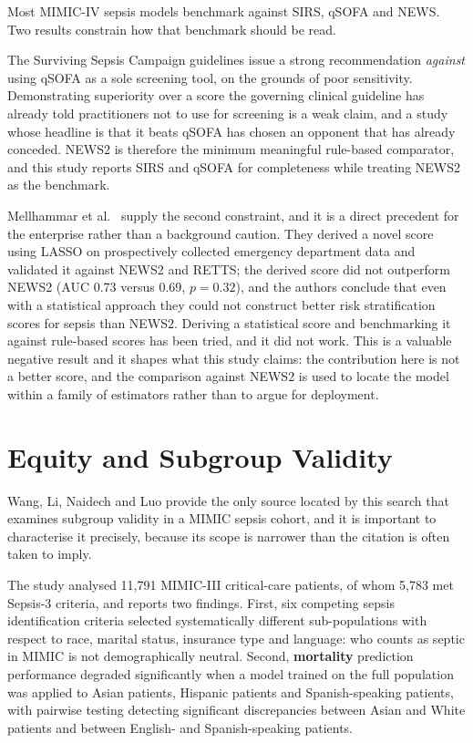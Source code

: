 Most MIMIC-IV sepsis models benchmark against SIRS, qSOFA and NEWS. Two results
constrain how that benchmark should be read.

The Surviving Sepsis Campaign guidelines \cite{evans2021ssc} issue a strong
recommendation \emph{against} using qSOFA as a sole screening tool, on the
grounds of poor sensitivity. Demonstrating superiority over a score the
governing clinical guideline has already told practitioners not to use for
screening is a weak claim, and a study whose headline is that it beats qSOFA
has chosen an opponent that has already conceded. NEWS2 is therefore the minimum
meaningful rule-based comparator, and this study reports SIRS and qSOFA for
completeness while treating NEWS2 as the benchmark.

Mellhammar et al.\ \cite{mellhammar2020news2} supply the second constraint, and
it is a direct precedent for the enterprise rather than a background caution.
They derived a novel score using LASSO on prospectively collected emergency
department data and validated it against NEWS2 and RETTS; the derived score did
not outperform NEWS2 (AUC 0.73 versus 0.69, $p = 0.32$), and the authors
conclude that even with a statistical approach they could not construct better
risk stratification scores for sepsis than NEWS2. Deriving a statistical score
and benchmarking it against rule-based scores has been tried, and it did not
work. This is a valuable negative result and it shapes what this study claims:
the contribution here is not a better score, and the comparison against NEWS2 is
used to locate the model within a family of estimators rather than to argue for
deployment.


\section{Equity and Subgroup Validity}
\label{sec:equity_lit}

Wang, Li, Naidech and Luo \cite{wang2022equity} provide the only source located
by this search that examines subgroup validity in a MIMIC sepsis cohort, and it
is important to characterise it precisely, because its scope is narrower than
the citation is often taken to imply.

The study analysed 11,791 MIMIC-III critical-care patients, of whom 5,783 met
Sepsis-3 criteria, and reports two findings. First, six competing sepsis
identification criteria selected systematically different sub-populations with
respect to race, marital status, insurance type and language: who counts as
septic in MIMIC is not demographically neutral. Second, \textbf{mortality}
prediction performance degraded significantly when a model trained on the full
population was applied to Asian patients, Hispanic patients and
Spanish-speaking patients, with pairwise testing detecting significant
discrepancies between Asian and White patients and between English- and
Spanish-speaking patients.

